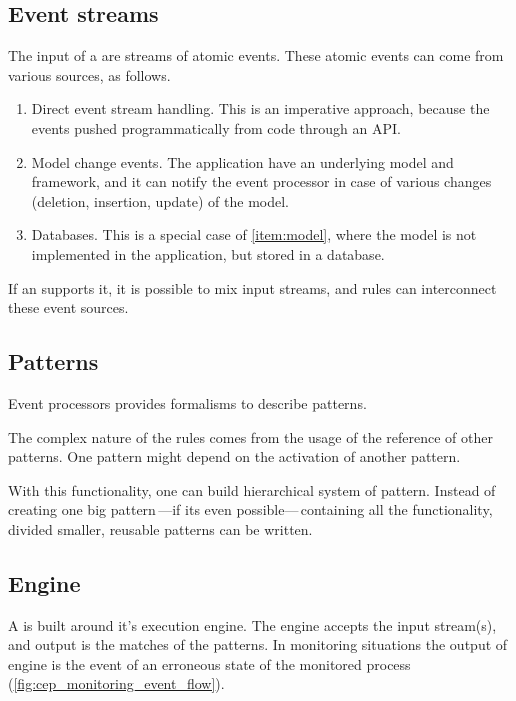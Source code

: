 \subsection{Event streams}
\label{subsec:cep_eventstream}
\label{subsection:event_streams}
The input of a \cep are streams of atomic events. These atomic events can come from various sources, as follows.
\begin{enumerate}
	\item Direct event stream handling. This is an imperative approach, because the events pushed programmatically from code through an API.

	\item Model change events. The application have an underlying model and framework, and it can notify the event processor in case of various changes (deletion, insertion, update) of the model.\label{item:model}

	\item Databases. This is a special case of \cref{item:model}, where the model is not implemented in the application, but stored in a database.
\end{enumerate}
\vspace{1ex}
If an \cep supports it, it is possible to mix input streams, and rules can interconnect these event sources.

\subsection{Patterns}
\label{subsec:cep_patterns}
Event processors provides formalisms to describe patterns.

The complex nature of the rules comes from the usage of the reference of other patterns. One pattern might depend on the activation of another pattern.

With this functionality, one can build hierarchical system of pattern. Instead of creating one big pattern\,---if its even possible---\,containing all the functionality, divided smaller, reusable patterns can be written.

\subsection{Engine}
\label{subsec:cep_engine}

A \cep is built around it's execution engine. The engine accepts the input stream(s), and output is the matches of the patterns. In monitoring situations the output of engine is the event of an erroneous state of the monitored process (\cref{fig:cep_monitoring_event_flow}).

